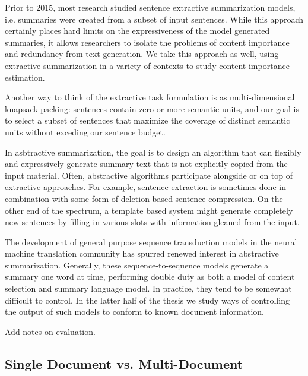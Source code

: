 Prior to 2015, most research studied sentence extractive summarization models,
i.e. summaries were created from a subset of input sentences.
While this approach certainly places hard limits on the expressiveness of 
the model generated summaries, it allows researchers to isolate the 
problems of content importance and redundancy from text generation.
We take this approach as well, using extractive summarization in a variety
of contexts to study content importance estimation.

Another way to think of the extractive task formulation is as multi-dimensional
knapsack packing: sentences contain zero or more semantic units, and our
goal is to select a subset of sentences that maximize the coverage of distinct semantic units without exceding our sentence budget. 



In asbtractive summarization, the goal is to design an algorithm that
can flexibly and expressively generate summary text that is not explicitly
copied from the input material. Often, abstractive algorithms participate
alongside or on top of extractive approaches.
For example, sentence extraction is sometimes done in combination with some 
form of deletion based sentence compression. On the other end of the spectrum,
a template based system might generate completely new sentences by filling
in various slots with information gleaned from the input. 

The development of general purpose sequence transduction models in the 
neural machine translation community has spurred renewed interest in 
abstractive summarization. Generally, these sequence-to-sequence models
generate a summary one word at time, performing double duty as both a model
of content selection and summary language model. In practice, they tend
to be somewhat difficult to control. In the latter half of the thesis
we study ways of controlling the output of such models to conform to
known document information.


Add notes on evaluation.




\subsection{Single Document vs. Multi-Document}

